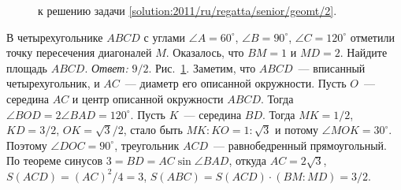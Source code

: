 \ifsolution
\begin{figure}\centering
    \caption{к решению задачи \ref{solution:2011/ru/regatta/senior/geomt/2}.}
    \label{fig:solution:2011/ru/regatta/senior/geomt/2}
\end{figure}
\fi %

\problem
В четырехугольнике $ABCD$ с углами
$\angle A = 60^{\circ}$, $\angle B = 90^{\circ}$, $\angle C = 120^{\circ}$
отметили точку пересечения диагоналей $M$.
Оказалось, что $BM = 1$ и $MD = 2$.
Найдите площадь $ABCD$.
\solution
\label{solution:2011/ru/regatta/senior/geomt/2}%
\emph{Ответ:} $9 / 2$.
Рис.~\ref{fig:solution:2011/ru/regatta/senior/geomt/2}.
Заметим, что $ABCD$~--- вписанный четырехугольник, и $AC$~--- диаметр его
описанной окружности.
Пусть $O$~--- середина $AC$ и центр описанной окружности $ABCD$.
Тогда $\angle BOD = 2 \angle BAD = 120^{\circ}$.
Пусть $K$~--- середина $BD$.
Тогда $MK = 1 / 2$, $KD = 3 / 2$, $OK = \sqrt{3} / 2$, стало быть
$MK : KO = 1 : \sqrt{3}$ и потому $\angle MOK = 30^{\circ}$.
Поэтому $\angle DOC = 90^{\circ}$, треугольник $ACD$~--- равнобедренный
прямоугольный.
По теореме синусов $3 = BD = AC \sin \angle BAD$, откуда
$AC = 2 \sqrt{3}$, $S(ACD) = (AC)^2 / 4 = 3$,
$S(ABC) = S(ACD) \cdot (BM : MD) = 3 / 2$.
\endproblem
